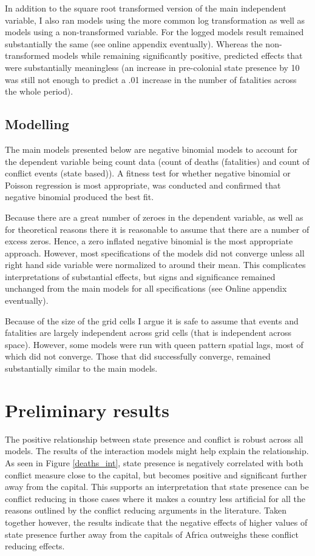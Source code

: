 \documentclass[12pt]{article}
\begin{document}
In addition to the square root transformed version of the main independent
variable, I also ran models using the more common log transformation as well as
models using a non-transformed variable. For the logged models result remained
substantially the same (see online appendix eventually). Whereas the
non-transformed models while remaining significantly positive, predicted effects
that were substantially meaningless (an increase in pre-colonial state presence
by 10 was still not enough to predict a .01 increase in the number of fatalities
across the whole period).

\subsection{Modelling}

The main models presented below are negative binomial models to account for the
dependent variable being count data (count of deaths (fatalities) and count of
conflict events (state based)). A fitness test for whether negative binomial or
Poisson regression is most appropriate, was conducted and confirmed that
negative binomial produced the best fit.

Because there are a great number of zeroes in the dependent variable, as well
as for theoretical reasons there it is reasonable to assume that there are a
number of excess zeros. Hence, a zero inflated negative binomial is the most
appropriate approach. However, most specifications of the models did not
converge unless all right hand side variable were normalized to around their
mean. This complicates interpretations of substantial effects, but signs and
significance remained unchanged from the main models for all specifications (see
Online appendix eventually).

Because of the size of the grid cells I argue it is safe to assume that events
and fatalities are largely independent across grid cells (that is independent
across space). However, some models were run with queen pattern spatial lags,
most of which did not converge. Those that did successfully converge, remained
substantially similar to the main models.

\section{Preliminary results}

The positive relationship between state presence and conflict is robust across
all models. The results of the interaction models might help explain the
relationship. As seen in Figure \ref{deaths_int}, state presence is negatively
correlated with both conflict measure close to the capital, but becomes positive
and significant further away from the capital. This supports an interpretation
that state presence can be conflict reducing in those cases where it makes a
country less artificial for all the reasons outlined by the conflict reducing
arguments in the literature. Taken together however, the results indicate that
the negative effects of higher values of state presence further away from the
capitals of Africa outweighs these conflict reducing effects. 
\end{document}

